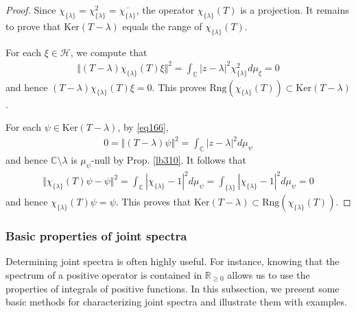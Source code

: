 \documentclass[12pt,b5paper,notitlepage]{article}
\theoremstyle{definition}
\theoremstyle{plain}
\newtheorem{co}[df]{Corollary}
\newcommand{\fk}{\mathfrak}
\newcommand{\ovl}{\overline}
\newcommand{\Cbb}{\mathbb C}
\newcommand{\Rbb}{\mathbb R}
\newcommand{\Ker}{\mathrm{Ker}}
\newcommand{\Sp}{\mathrm{Sp}}
\newcommand{\Rng}{\mathrm{Rng}}
\newcommand{\MH}{\mathcal H}
\numberwithin{equation}{section}
\begin{document}
\begin{proof}
Since $\chi_{\{\lambda\}}=\chi_{\{\lambda\}}^2=\ovl{\chi_{\{\lambda\}}}$, the operator $\chi_{\{\lambda\}}(T)$ is a projection. It remains to prove that $\Ker(T-\lambda)$ equals the range of $\chi_{\{\lambda\}}(T)$.

For each $\xi\in\MH$, we compute that
\begin{align*}
\Vert (T-\lambda)\chi_{\{\lambda\}}(T)\xi\Vert^2=\int_\Cbb |z-\lambda|^2\chi_{\{\lambda\}}^2d\mu_\xi=0
\end{align*}
and hence $(T-\lambda)\chi_{\{\lambda\}}(T)\xi=0$. This proves $\Rng(\chi_{\{\lambda\}}(T))\subset\Ker(T-\lambda)$.


For each $\psi\in\Ker(T-\lambda)$, by \eqref{eq166},
\begin{align*}
0=\Vert (T-\lambda)\psi\Vert^2=\int_\Cbb |z-\lambda|^2d\mu_\psi
\end{align*}
and hence $\Cbb\setminus\lambda$ is $\mu_\psi$-null by Prop. \ref{lb310}. It follows that
\begin{align*}
\Vert \chi_{\{\lambda\}}(T)\psi-\psi\Vert^2=\int_\Cbb |\chi_{\{\lambda\}}-1|^2d\mu_\psi=\int_{\{\lambda\}} |\chi_{\{\lambda\}}-1|^2d\mu_\psi=0
\end{align*}
and hence $\chi_{\{\lambda\}}(T)\psi=\psi$. This proves that $\Ker(T-\lambda)\subset\Rng(\chi_{\{\lambda\}}(T))$.
\end{proof}


\begin{comment}
\begin{co}
Let $T\in\fk L(\MH)$ be normal. Suppose that $\lambda\in\Sp(T)$ is an isolated point of $\Sp(T)$. Then $\Ker(T-\lambda)\neq0$.
\end{co}

\begin{proof}
There exists an open set $U\subset\Cbb$ such that $U\cap\Sp(T)=\{\lambda\}$. So $\chi_{\{\lambda\}}(T)=\chi_U(T)\neq0$, and hence $\Ker(T-\lambda)\neq0$ by Prop. \ref{lb317}.
\end{proof}

\end{comment}




\subsubsection{Basic properties of joint spectra}

Determining joint spectra is often highly useful. For instance, knowing that the spectrum of a positive operator is contained in $\Rbb_{\geq0}$ allows us to use the properties of integrals of positive functions. In this subsection, we present some basic methods for characterizing joint spectra and illustrate them with examples.
\end{document}
